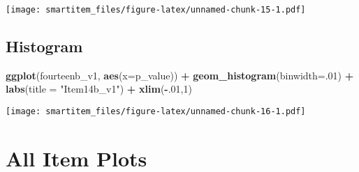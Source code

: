 \documentclass[]{book}
\newenvironment{Shaded}{\begin{snugshade}}{\end{snugshade}}
\newcommand{\KeywordTok}[1]{\textcolor[rgb]{0.13,0.29,0.53}{\textbf{#1}}}
\newcommand{\DataTypeTok}[1]{\textcolor[rgb]{0.13,0.29,0.53}{#1}}
\newcommand{\DecValTok}[1]{\textcolor[rgb]{0.00,0.00,0.81}{#1}}
\newcommand{\FloatTok}[1]{\textcolor[rgb]{0.00,0.00,0.81}{#1}}
\newcommand{\StringTok}[1]{\textcolor[rgb]{0.31,0.60,0.02}{#1}}
\newcommand{\OperatorTok}[1]{\textcolor[rgb]{0.81,0.36,0.00}{\textbf{#1}}}
\newcommand{\NormalTok}[1]{#1}
\theoremstyle{definition}
\theoremstyle{definition}
\theoremstyle{definition}
\theoremstyle{remark}
\begin{document}
\begin{Shaded}
\end{Shaded}

\texttt{[image: smartitem\_files/figure-latex/unnamed-chunk-15-1.pdf]}

\subsection{Histogram}\label{histogram-5}

\begin{Shaded}
\begin{Highlighting}[]
\KeywordTok{ggplot}\NormalTok{(fourteenb_v1, }\KeywordTok{aes}\NormalTok{(}\DataTypeTok{x=}\NormalTok{p_value)) }\OperatorTok{+}\StringTok{ }\KeywordTok{geom_histogram}\NormalTok{(}\DataTypeTok{binwidth=}\NormalTok{.}\DecValTok{01}\NormalTok{) }\OperatorTok{+}\StringTok{ }\KeywordTok{labs}\NormalTok{(}\DataTypeTok{title =} \StringTok{"Item14b_v1"}\NormalTok{) }\OperatorTok{+}\StringTok{ }\KeywordTok{xlim}\NormalTok{(}\OperatorTok{-}\NormalTok{.}\DecValTok{01}\NormalTok{,}\DecValTok{1}\NormalTok{)}
\end{Highlighting}
\end{Shaded}

\texttt{[image: smartitem\_files/figure-latex/unnamed-chunk-16-1.pdf]}

\section{All Item Plots}\label{all-item-plots}
\end{document}

